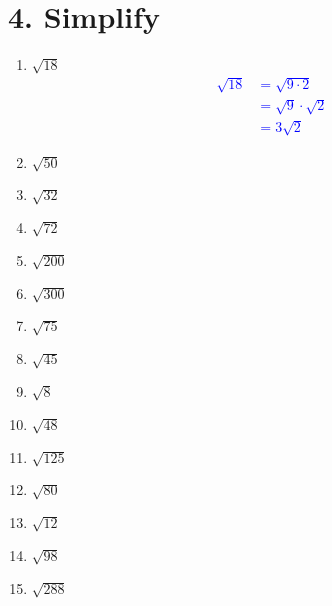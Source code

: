 \documentclass{hw}
\begin{document}
\begin{center}
\end{center}

\section*{\normalsize 4. Simplify}
\begin{enumerate}[label=\alph*.]
    \item $\sqrt{18}$
        \textcolor{blue}{
        \begin{align*}
        \sqrt{18} &= \sqrt{9 \cdot 2} \\
                  &= \sqrt{9} \cdot \sqrt{2} \\
                  &= 3 \sqrt{2}
        \end{align*}
        }
    \item $\sqrt{50}$
        \studentxlargeworkspace
    \item $\sqrt{32}$
        \studentxlargeworkspace
    \item $\sqrt{72}$
        \studentxlargeworkspace
    \item $\sqrt{200}$
        \studentworkspace
    \item $\sqrt{300}$
        \studentworkspace
    \item $\sqrt{75}$
        \studentworkspace
    \item $\sqrt{45}$
        \studentworkspace
    \item $\sqrt{8}$
        \studentworkspace
    \item $\sqrt{48}$
        \studentworkspace
    \item $\sqrt{125}$
        \studentworkspace
    \item $\sqrt{80}$
        \studentworkspace
    \item $\sqrt{12}$
        \studentworkspace
    \item $\sqrt{98}$
        \studentworkspace
    \item $\sqrt{288}$
        \studentworkspace
\end{enumerate}
\end{document}
